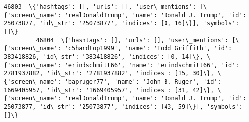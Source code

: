 \documentclass[11pt]{article}
\begin{document}
\begin{Verbatim}[commandchars=\\\{\}]
         46803  \{'hashtags': [], 'urls': [], 'user\_mentions': [\{'screen\_name': 'realDonaldTrump', 'name': 'Donald J. Trump', 'id': 25073877, 'id\_str': '25073877', 'indices': [0, 16]\}], 'symbols': []\}                                                                                                                                                                                                                                                                                                                                                                                                                                                                                                                                                                                                                                                                                                                                                                                                                                                                                                                                                                                                                        
         46804  \{'hashtags': [], 'urls': [], 'user\_mentions': [\{'screen\_name': 'c5hardtop1999', 'name': 'Todd Griffith', 'id': 383418826, 'id\_str': '383418826', 'indices': [0, 14]\}, \{'screen\_name': 'erindschmitt66', 'name': 'erindschmitt66', 'id': 2781937882, 'id\_str': '2781937882', 'indices': [15, 30]\}, \{'screen\_name': 'bapruger77', 'name': 'John B. Ruger', 'id': 1669405957, 'id\_str': '1669405957', 'indices': [31, 42]\}, \{'screen\_name': 'realDonaldTrump', 'name': 'Donald J. Trump', 'id': 25073877, 'id\_str': '25073877', 'indices': [43, 59]\}], 'symbols': []\}                                                                                                                                                                                                                                                                                                                                                                                                                                                                                                                                                                                                                                             

\end{Verbatim}
\end{document}
